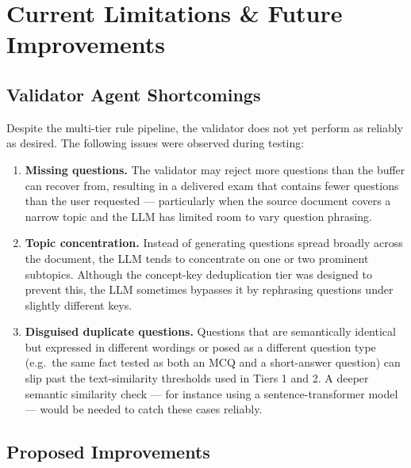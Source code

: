 \documentclass[12pt, a4paper]{article}
\begin{document}
\section{Current Limitations \& Future Improvements}

\subsection{Validator Agent Shortcomings}

Despite the multi-tier rule pipeline, the validator does not yet perform as reliably as desired. The following issues were observed during testing:

\begin{enumerate}[leftmargin=1.5em, itemsep=0.3em]
  \item \textbf{Missing questions.} The validator may reject more questions than the buffer can recover from, resulting in a delivered exam that contains fewer questions than the user requested — particularly when the source document covers a narrow topic and the LLM has limited room to vary question phrasing.

  \item \textbf{Topic concentration.} Instead of generating questions spread broadly across the document, the LLM tends to concentrate on one or two prominent subtopics. Although the concept-key deduplication tier was designed to prevent this, the LLM sometimes bypasses it by rephrasing questions under slightly different keys.

  \item \textbf{Disguised duplicate questions.} Questions that are semantically identical but expressed in different wordings or posed as a different question type (e.g.\ the same fact tested as both an MCQ and a short-answer question) can slip past the text-similarity thresholds used in Tiers 1 and 2. A deeper semantic similarity check — for instance using a sentence-transformer model — would be needed to catch these cases reliably.
\end{enumerate}

\subsection{Proposed Improvements}
\end{document}
